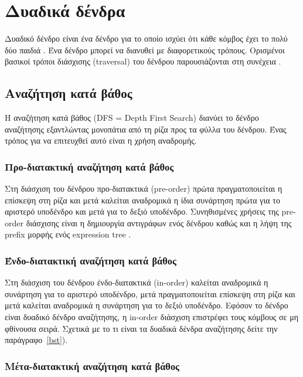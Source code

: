 \section{Δυαδικά δένδρα}

Δυαδικό δένδρο είναι ένα δένδρο για το οποίο ισχύει ότι κάθε κόμβος έχει το πολύ δύο παιδιά \cite{parlante_binary_tree}. Ένα δένδρο μπορεί να διανυθεί με διαφορετικούς τρόπους. Ορισμένοι βασικοί τρόποι διάσχισης (traversal) του δένδρου παρουσιάζονται στη συνέχεια \cite{g4g_traversals}.

\subsection{Αναζήτηση κατά βάθος}

Η αναζήτηση κατά βάθος (DFS = Depth First Search) διανύει το δένδρο αναζήτησης εξαντλώντας μονοπάτια από τη ρίζα προς τα φύλλα του δένδρου. Ένας τρόπος για να επιτευχθεί αυτό είναι η χρήση αναδρομής. 

\subsubsection{Προ-διατακτική αναζήτηση κατά βάθος}

Στη διάσχιση του δένδρου προ-διατακτικά (pre-order) πρώτα πραγματοποιείται η επίσκεψη στη ρίζα και μετά καλείται αναδρομικά η ίδια συνάρτηση πρώτα για το αριστερό υποδένδρο και μετά για το δεξιό υποδένδρο. 
Συνηθισμένες χρήσεις της pre-order διάσχισης είναι η δημιουργία αντιγράφων ενός δένδρου καθώς και η λήψη της prefix μορφής ενός expression tree \cite{wikipedia_polish_notation}.

\subsubsection{Ένδο-διατακτική αναζήτηση κατά βάθος}

Στη διάσχιση του δένδρου ένδο-διατακτικά (in-order) καλείται αναδρομικά η συνάρτηση για το αριστερό υποδένδρο, μετά πραγματοποιείται επίσκεψη στη ρίζα και μετά καλείται αναδρομικά η συνάρτηση για το δεξιό υποδένδρο.
Εφόσον το δένδρο είναι δυαδικό δένδρο αναζήτησης, η in-order διάσχιση επιστρέφει τους κόμβους σε μη φθίνουσα σειρά. Σχετικά με το τι είναι τα δυαδικά δένδρα αναζήτησης δείτε την παράγραφο~\ref{bst}).

\subsubsection{Μέτα-διατακτική αναζήτηση κατά βάθος}

